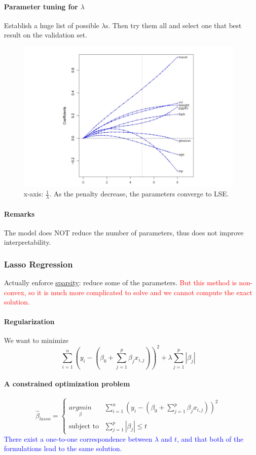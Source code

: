 \documentclass[11pt]{article}
\newcommand{\under}[1]{\underline{#1}}
\begin{document}
\paragraph{Parameter tuning for $\lambda$}
Establish a huge list of possible $\lambda$s. Then try them all and select one that best result on the validation set.
\begin{figure}[h]
	\centering
	\includegraphics[scale=0.6]{ridge.png}
	\caption{x-axis: $\frac{1}{\lambda}$. As the penalty decrease, the parameters converge to LSE.}
\end{figure}

\paragraph{Remarks}
The model does NOT reduce the number of parameters, thus does not improve interpretability.

\subsubsection{Lasso Regression}
Actually enforce \under{sparsity}: reduce some of the parameters. \textcolor{red}{But this method is non-convex, so it is much more complicated to solve and we cannot compute the exact solution.}
\paragraph{Regularization}
We want to minimize
$$ 
\sum_{i=1}^n(y_i - (\beta_0 + \sum_{j=1}^p \beta_j x_{i,j}))^2 + \lambda \sum_{j=1}^p |\beta_j|$$
\paragraph{A constrained optimization problem}
$$ \hat{\beta}_{lasso} = \begin{cases}
 \underset{\beta}{argmin} & 	\sum_{i=1}^n(y_i - (\beta_0 + \sum_{j=1}^p \beta_j x_{i,j}))^2 
 \\
 \text{subject to} & \sum_{j=1}^p |\beta_j| \leq t
 \end{cases} $$
 \textcolor{blue}{There exist a one-to-one correspondence between $\lambda$ and $t$, and that both of the formulations lead to the same solution.}
 
\end{document}
